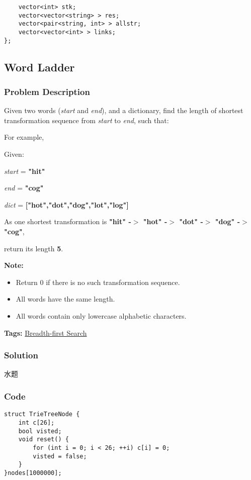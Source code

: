 \documentclass{article}
\begin{document}
\begin{CJK*}{UTF8}{gkai}
\begin{lstlisting}
    vector<int> stk;
    vector<vector<string> > res;
    vector<pair<string, int> > allstr;
    vector<vector<int> > links;
}; 
\end{lstlisting}


\subsection{ Word Ladder }
\label{ Word Ladder }

\subsubsection*{Problem Description}
Given two words (\emph{start} and \emph{end}), and a dictionary, find the length of shortest transformation sequence from \emph{start} to \emph{end}, such that:

For example,

Given:


\emph{start} = \textbf{"hit"}


\emph{end} = \textbf{"cog"}


\emph{dict} = \textbf{["hot","dot","dog","lot","log"]}

As one shortest transformation is \textbf{"hit" -$>$ "hot" -$>$ "dot" -$>$ "dog" -$>$ "cog"},


return its length \textbf{5}.

\textbf{Note:}



\begin{itemize}
\item Return 0 if there is no such transformation sequence.
\item All words have the same length.
\item All words contain only lowercase alphabetic characters.
\end{itemize}


\textbf{Tags: }
\hyperref[ Breadth-first Search ]{ Breadth-first Search }



\subsubsection*{Solution}
水题

\subsubsection*{Code}
\begin{lstlisting}
struct TrieTreeNode {
    int c[26];
    bool visted;
    void reset() {
        for (int i = 0; i < 26; ++i) c[i] = 0;
        visted = false;
    }
}nodes[1000000];


\end{lstlisting}
\end{CJK*}
\end{document}
